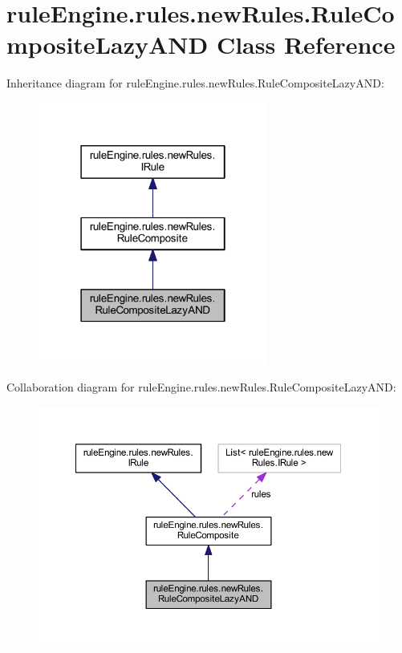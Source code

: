 \hypertarget{classrule_engine_1_1rules_1_1new_rules_1_1_rule_composite_lazy_a_n_d}{}\section{rule\+Engine.\+rules.\+new\+Rules.\+Rule\+Composite\+Lazy\+A\+ND Class Reference}
\label{classrule_engine_1_1rules_1_1new_rules_1_1_rule_composite_lazy_a_n_d}


Inheritance diagram for rule\+Engine.\+rules.\+new\+Rules.\+Rule\+Composite\+Lazy\+A\+ND\+:
\nopagebreak
\begin{figure}[H]
\begin{center}
\leavevmode
\includegraphics[width=214pt]{classrule_engine_1_1rules_1_1new_rules_1_1_rule_composite_lazy_a_n_d__inherit__graph}
\end{center}
\end{figure}


Collaboration diagram for rule\+Engine.\+rules.\+new\+Rules.\+Rule\+Composite\+Lazy\+A\+ND\+:
\nopagebreak
\begin{figure}[H]
\begin{center}
\leavevmode
\includegraphics[width=350pt]{classrule_engine_1_1rules_1_1new_rules_1_1_rule_composite_lazy_a_n_d__coll__graph}
\end{center}
\end{figure}
